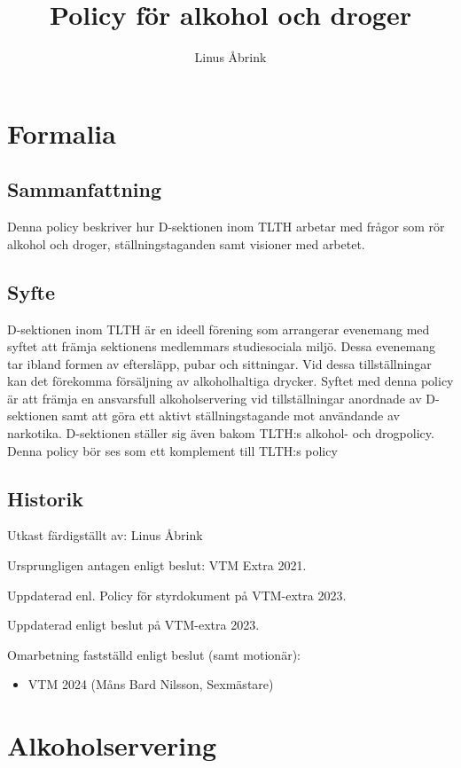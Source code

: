 \documentclass[]{dsekprotokoll}
\title{Policy för alkohol och droger}
\author{Linus Åbrink}
\begin{document}
\maketitle

\section{Formalia}

\subsection{Sammanfattning}
Denna policy beskriver hur D-sektionen inom TLTH arbetar med frågor som rör alkohol och droger, ställningstaganden samt visioner med arbetet.

\subsection{Syfte}
D-sektionen inom TLTH är en ideell förening som arrangerar evenemang
med syftet att främja sektionens medlemmars studiesociala miljö. Dessa evenemang tar ibland formen av eftersläpp, pubar och sittningar. Vid dessa tillställningar kan det förekomma försäljning av alkoholhaltiga drycker. Syftet med denna policy är att främja en ansvarsfull alkoholservering vid tillställningar anordnade av D-sektionen samt att göra ett aktivt ställningstagande mot användande av narkotika. D-sektionen ställer sig även bakom TLTH:s alkohol- och drogpolicy. Denna policy bör ses som ett komplement till TLTH:s policy

\subsection{Historik}
Utkast färdigställt av: Linus Åbrink

Ursprungligen antagen enligt beslut: VTM Extra 2021.

Uppdaterad enl. Policy för styrdokument på VTM-extra 2023.

Uppdaterad enligt beslut på VTM-extra 2023.

Omarbetning fastställd enligt beslut (samt motionär):
\begin{itemize}
    \item VTM 2024 (Måns Bard Nilsson, Sexmästare)
\end{itemize}

\section{Alkoholservering}
\end{document}

